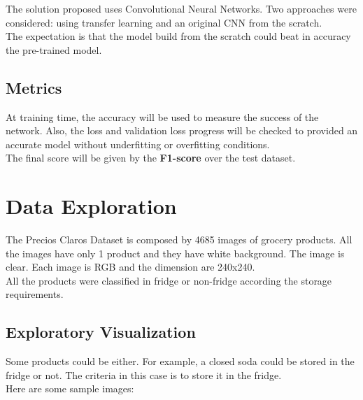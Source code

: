 \documentclass[a4paper,10pt]{article}
\begin{document}
The solution proposed uses Convolutional Neural Networks. Two approaches were considered: using transfer learning and an original CNN from the scratch.\\

The expectation is that the model build from the scratch could beat in accuracy the pre-trained model.\\

\subsection{Metrics}

At training time, the accuracy will be used to measure the success of the network. Also, the loss and validation loss progress will be checked to provided an accurate model without underfitting or overfitting conditions.\\

The final score will be given by the \textbf{F1-score} over the test dataset.


\section{Data Exploration}

The Precios Claros Dataset is composed by 4685 images of grocery products. All the images have only 1 product and they have white background. The image is clear.  Each image is RGB and the dimension are 240x240. \\

All the products were classified in fridge or non-fridge according the storage requirements.\\


\subsection{Exploratory Visualization}

Some products could be either. For example, a closed soda could be stored in the fridge or not. The criteria in this case is to store it in the fridge. \\

Here are some sample images:
\end{document}
